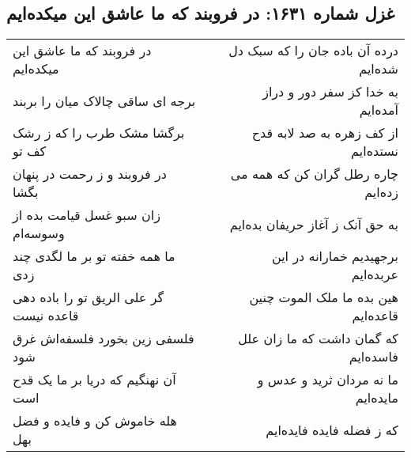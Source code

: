 \begin{center}
\section*{غزل شماره ۱۶۳۱: در فروبند که ما عاشق این میکده‌ایم}
\label{sec:1631}
\begin{longtable}{l p{0.5cm} r}
در فروبند که ما عاشق این میکده‌ایم
&&
درده آن باده جان را که سبک دل شده‌ایم
\\
برجه ای ساقی چالاک میان را بربند
&&
به خدا کز سفر دور و دراز آمده‌ایم
\\
برگشا مشک طرب را که ز رشک کف تو
&&
از کف زهره به صد لابه قدح نستده‌ایم
\\
در فروبند و ز رحمت در پنهان بگشا
&&
چاره رطل گران کن که همه می زده‌ایم
\\
زان سبو غسل قیامت بده از وسوسه‌ام
&&
به حق آنک ز آغاز حریفان بده‌ایم
\\
ما همه خفته تو بر ما لگدی چند زدی
&&
برجهیدیم خمارانه در این عربده‌ایم
\\
گر علی الریق تو را باده دهی قاعده نیست
&&
هین بده ما ملک الموت چنین قاعده‌ایم
\\
فلسفی زین بخورد فلسفه‌اش غرق شود
&&
که گمان داشت که ما زان علل فاسده‌ایم
\\
آن نهنگیم که دریا بر ما یک قدح است
&&
ما نه مردان ثرید و عدس و مایده‌ایم
\\
هله خاموش کن و فایده و فضل بهل
&&
که ز فضله فایده فایده‌ایم
\\
\end{longtable}
\end{center}
